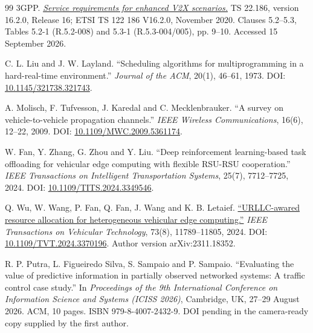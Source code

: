 \documentclass[12pt,a4paper]{article}
\begin{document}
\begin{thebibliography}{99}
 3GPP. \href{\detokenize{https://www.etsi.org/deliver/etsi_ts/122100_122199/122186/16.02.00_60/ts_122186v160200p.pdf}}{\emph{Service requirements for enhanced V2X scenarios.}} TS 22.186, version 16.2.0, Release 16; ETSI TS 122 186 V16.2.0, November 2020. Clauses 5.2--5.3, Tables 5.2-1 (R.5.2-008) and 5.3-1 (R.5.3-004/005), pp. 9--10. Accessed 15 September 2026.

 C. L. Liu and J. W. Layland. ``Scheduling algorithms for multiprogramming in a hard-real-time environment.'' \emph{Journal of the ACM}, 20(1), 46--61, 1973. DOI: \href{\detokenize{https://doi.org/10.1145/321738.321743}}{10.1145/321738.321743}.

 A. Molisch, F. Tufvesson, J. Karedal and C. Mecklenbrauker. ``A survey on vehicle-to-vehicle propagation channels.'' \emph{IEEE Wireless Communications}, 16(6), 12--22, 2009. DOI: \href{\detokenize{https://doi.org/10.1109/MWC.2009.5361174}}{10.1109/MWC.2009.5361174}.

 W. Fan, Y. Zhang, G. Zhou and Y. Liu. ``Deep reinforcement learning-based task offloading for vehicular edge computing with flexible RSU-RSU cooperation.'' \emph{IEEE Transactions on Intelligent Transportation Systems}, 25(7), 7712--7725, 2024. DOI: \href{\detokenize{https://doi.org/10.1109/TITS.2024.3349546}}{10.1109/TITS.2024.3349546}.

 Q. Wu, W. Wang, P. Fan, Q. Fan, J. Wang and K. B. Letaief. \href{\detokenize{https://arxiv.org/abs/2311.18352}}{``URLLC-awared resource allocation for heterogeneous vehicular edge computing.''} \emph{IEEE Transactions on Vehicular Technology}, 73(8), 11789--11805, 2024. DOI: \href{\detokenize{https://doi.org/10.1109/TVT.2024.3370196}}{10.1109/TVT.2024.3370196}. Author version arXiv:2311.18352.

 R. P. Putra, L. Figueiredo Silva, S. Sampaio and P. Sampaio. ``Evaluating the value of predictive information in partially observed networked systems: A traffic control case study.'' In \emph{Proceedings of the 9th International Conference on Information Science and Systems (ICISS 2026)}, Cambridge, UK, 27--29 August 2026. ACM, 10 pages. ISBN 979-8-4007-2432-9. DOI pending in the camera-ready copy supplied by the first author.


\end{thebibliography}
\end{document}
